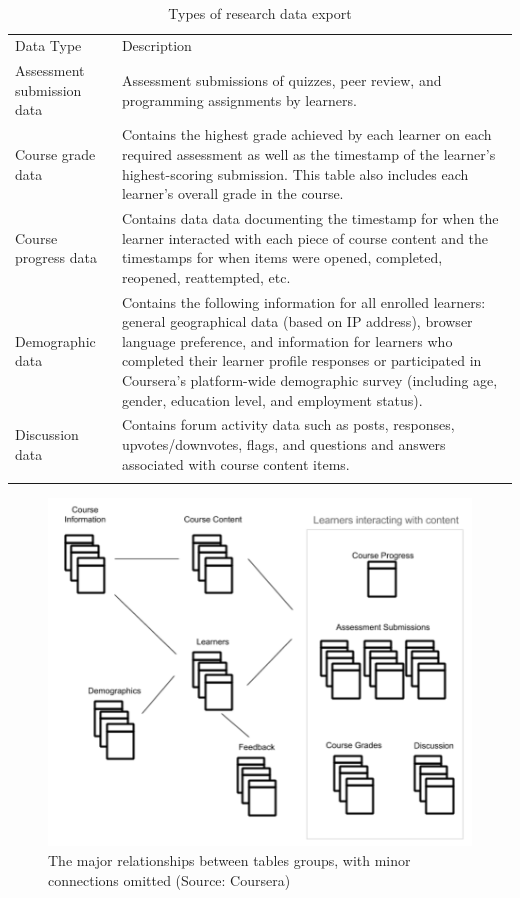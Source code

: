 \begin{table}
\footnotesize
\caption{Types of research data export}\
\centering
\label{tab:datatypes}
\begin{tabular}{p{4cm}|p{7cm}}
Data Type & Description \\
\addlinespace
\toprule
Assessment submission data & Assessment submissions of quizzes, peer review, and programming assignments by learners.\\
\midrule
Course grade data & Contains the highest grade achieved by each learner on each required assessment as well as the timestamp of the learner's highest-scoring submission. This table also includes each learner's overall grade in the course.\\
\midrule
Course progress data & Contains data data documenting the timestamp for when the learner interacted with each piece of course content and the timestamps for when items were opened, completed, reopened, reattempted, etc.\\
\midrule
Demographic data & Contains the following information for all enrolled learners: general geographical data (based on IP address), browser language preference, and information for learners who completed their learner profile responses or participated in Coursera's platform-wide demographic survey (including age, gender, education level, and employment status).\\
\midrule
Discussion data & Contains forum activity data such as posts, responses, upvotes/downvotes, flags, and questions and answers associated with course content items.\\
\addlinespace
\bottomrule
\end{tabular}
\end{table}

\begin{figure}[htbp]
    \centering
    \includegraphics[scale=0.5]{datatables}
    \caption{The major relationships between tables groups, with minor connections omitted (Source: Coursera)}
    \label{figure:datatables}
\end{figure}

